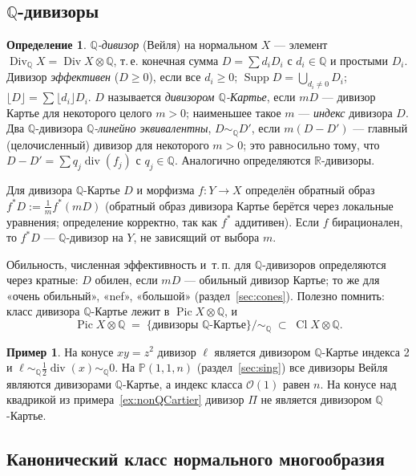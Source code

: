 \documentclass[11pt,a4paper]{article}
\theoremstyle{plain}
\theoremstyle{definition}
\newtheorem{definition}[theorem]{Определение}
\newtheorem{example}[theorem]{Пример}
\theoremstyle{remark}
\newcommand{\Q}{\mathbb{Q}}
\newcommand{\R}{\mathbb{R}}
\newcommand{\PP}{\mathbb{P}}
\newcommand{\cO}{\mathcal{O}}
\DeclareMathOperator{\Pic}{Pic}
\DeclareMathOperator{\Cl}{Cl}
\DeclareMathOperator{\Div}{Div}
\DeclareMathOperator{\divv}{div}
\DeclareMathOperator{\Supp}{Supp}
\begin{document}
\subsection{\texorpdfstring{$\Q$}{Q}-дивизоры}

\begin{definition}
\emph{$\Q$-дивизор} (Вейля) на нормальном $X$ --- элемент $\Div_\Q X=\Div X\otimes\Q$, т.\,е.
конечная сумма $D=\sum d_iD_i$ с $d_i\in\Q$ и простыми $D_i$. Дивизор \emph{эффективен}
($D\ge0$), если все $d_i\ge0$; $\Supp D=\bigcup_{d_i\ne0}D_i$; $\lfloor D\rfloor=\sum\lfloor d_i\rfloor D_i$.
$D$ называется \emph{дивизором $\Q$-Картье}, если $mD$ --- дивизор Картье для некоторого целого $m>0$;
наименьшее такое $m$ --- \emph{индекс} дивизора $D$. Два $\Q$-дивизора \emph{$\Q$-линейно
эквивалентны}, $D\sim_\Q D'$, если $m(D-D')$ --- главный (целочисленный) дивизор для некоторого
$m>0$; это равносильно тому, что $D-D'=\sum q_j\divv(f_j)$ с $q_j\in\Q$. Аналогично определяются
$\R$-дивизоры.
\end{definition}

Для дивизора $\Q$-Картье $D$ и морфизма $f\colon Y\to X$ определён обратный образ
$f^*D:=\frac1m f^*(mD)$ (обратный образ дивизора Картье берётся через локальные уравнения;
определение корректно, так как $f^*$ аддитивен). Если $f$ бирационален, то $f^*D$ --- $\Q$-дивизор
на $Y$, не зависящий от выбора $m$.

Обильность, численная эффективность и~т.\,п. для $\Q$-дивизоров определяются через кратные:
$D$ обилен, если $mD$ --- обильный дивизор Картье; то же для «очень обильный», «nef», «большой»
(раздел~\ref{sec:cones}). Полезно помнить: класс дивизора $\Q$-Картье лежит в $\Pic X\otimes\Q$,
и
\[
\Pic X\otimes\Q\;=\;\{\text{дивизоры $\Q$-Картье}\}/{\sim_\Q}\;\subset\;\Cl X\otimes\Q .
\]

\begin{example}
На конусе $xy=z^2$ дивизор $\ell$ является дивизором $\Q$-Картье индекса 2 и $\ell\sim_\Q\frac12\divv(x)\sim_\Q0$.
На $\PP(1,1,n)$ (раздел~\ref{sec:sing}) все дивизоры Вейля являются дивизорами $\Q$-Картье, а индекс класса
$\cO(1)$ равен $n$. На конусе над квадрикой из примера~\ref{ex:nonQCartier} дивизор $\Pi$ не является
дивизором $\Q$-Картье.
\end{example}

\subsection{Канонический класс нормального многообразия}\label{ss:canonical-normal}
\end{document}

